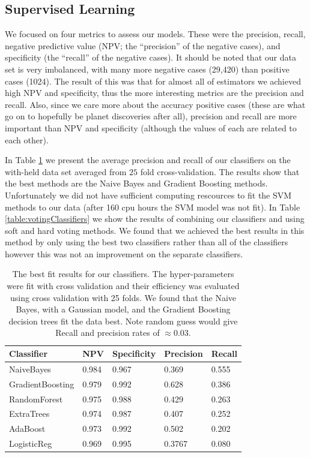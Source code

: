 \subsection{Supervised Learning}

We focused on four metrics to assess our models. These were the precision, recall, negative predictive value (NPV; the ``precision'' of the negative cases), and specificity (the ``recall'' of the negative cases).  It should be noted that our data set is very imbalanced, with many more negative cases (29,420) than positive cases (1024). The result of this was that for almost all of estimators we achieved high NPV and specificity, thus the more interesting metrics are the precision and recall.  Also, since we care more about the accuracy positive cases (these are what go on to hopefully be planet discoveries after all), precision and recall are more important than NPV and specificity (although the values of each are related to each other).

In Table \ref{table:classifiers} we present the average precision and recall of our classifiers on the with-held data set averaged from $25$ fold cross-validation. The results show that the best methods are the Naive Bayes and Gradient Boosting methods.  Unfortunately we did not have sufficient computing rescources to fit the SVM methods to our data (after 160 cpu hours the SVM model was not fit). In Table \ref{table:votingClassifiers} we show the results of combining our classifiers and using soft and hard voting methods. We found that we achieved the best results in this method by only using the best two classifiers rather than all of the classifiers however this was not an improvement on the separate classifiers. 
\begin{table}
\centering
 \begin{tabular}{|l |l |l |l |l |}
\hline
Classifier &NPV & Specificity &Precision & Recall  \\ \hline
 NaiveBayes & 0.984 &  0.967&  0.369 & 0.555 \\ 
GradientBoosting & 0.979 & 0.992 &  0.628 & 0.386\\
RandomForest & 0.975 &  0.988 & 0.429&  0.263 \\
ExtraTrees & 0.974 & 0.987 &  0.407& 0.252 \\
AdaBoost & 0.973&  0.992 & 0.502& 0.202 \\
LogisticReg &0.969 &  0.995& 0.3767 &  0.080\\\hline
\end{tabular}
\caption{The best fit results for our classifiers. The hyper-parameters were fit with cross validation and their efficiency was evaluated using cross validation with 25 folds. We found that the Naive Bayes, with a Gaussian model, and the Gradient Boosting decision trees fit the data best. Note random guess would give Recall and precision rates of $\approx 0.03$. }
\label{table:classifiers}
\end{table}

